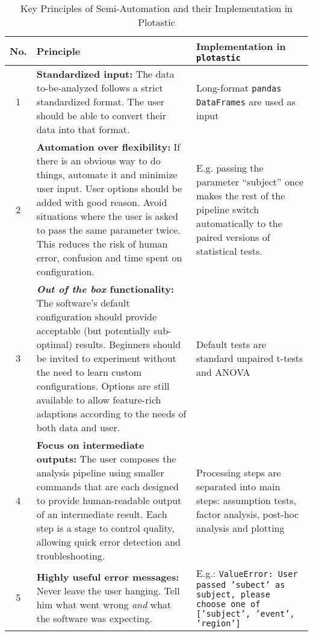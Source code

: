 \begin{table}[h]
    \caption{Key Principles of Semi-Automation and their Implementation in Plotastic}
    \footnotesize
    \centering
    \label{tab:semi-auto-principles}
    \begin{tabular}{|c|p{}|p{}|}
        \hline
        \textbf{No.}
         & \textbf{Principle}
         & \textbf{Implementation in \texttt{plotastic}}
        \\
        \hline
        1
         & \textbf{Standardized input:} The data to-be-analyzed follows a
        strict standardized format. The user should be able to convert their
        data into that format.
         & Long-format \texttt{pandas} \texttt{DataFrames} are used as input
        \\
        \hline
        2
         & \textbf{Automation over flexibility:} If there is an obvious way
        to do things, automate it and minimize user input. User options
        should be added with good reason. Avoid situations where the user is
        asked to pass the same parameter twice. This reduces the risk of
        human error, confusion and time spent on configuration.
         & E.g.
        passing the parameter ``subject'' once makes the rest of the
        pipeline switch automatically to the paired versions of statistical
        tests.
        \\
        \hline
        3%
         & \textbf{\emph{Out of the box} functionality:} The software's
        default configuration should provide acceptable (but potentially
        sub-optimal) results. Beginners should be invited to experiment
        without the need to learn custom configurations. Options are still
        available to allow feature-rich adaptions according to the needs of
        both data and user.%
         & Default tests are standard unpaired t-tests and ANOVA             %
        \\%
        \hline
        4
         & \textbf{Focus on intermediate outputs:} The user composes the
        analysis pipeline using smaller commands that are each designed to
        provide human-readable output of an intermediate result. Each step
        is a stage to control quality, allowing quick error detection and
        troubleshooting.
         & Processing steps are separated into main steps:
        assumption tests, factor analysis, post-hoc analysis and plotting
        \\
        \hline
        5
         & \textbf{Highly useful error messages:} Never leave the user
        hanging. Tell him what went wrong \emph{and} what the software was
        expecting.
         & E.g.: \texttt{ValueError: User passed 'subect' as
        subject, please choose one of ['subject', 'event', 'region']}        \\
        \hline
    \end{tabular}
\end{table}




